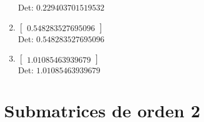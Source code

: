 \documentclass[12pt]{article}
\begin{document}
\begin{enumerate}
Det: $0.229403701519532$\\

\item $\displaystyle \left[\begin{matrix}0.548283527695096\end{matrix}\right]$\\

Det: $0.548283527695096$\\

\item $\displaystyle \left[\begin{matrix}1.01085463939679\end{matrix}\right]$\\

Det: $1.01085463939679$\\

\end{enumerate}


\section*{Submatrices de orden 2}
\end{document}
